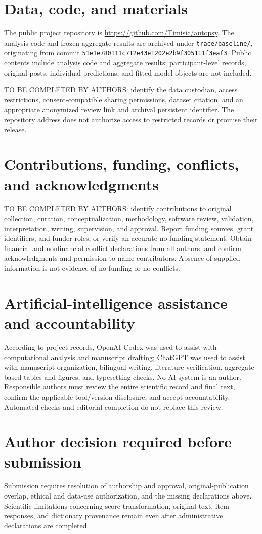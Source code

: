 \section{Data, code, and materials}
The public project repository is \url{https://github.com/Timisic/autopsy}. The analysis code and frozen aggregate results are archived under \texttt{trace/baseline/}, originating from commit \texttt{51e1e780111c712e43e1202e2b9f305111f3eaf3}. Public contents include analysis code and aggregate results; participant-level records, original posts, individual predictions, and fitted model objects are not included.

TO BE COMPLETED BY AUTHORS: identify the data custodian, access restrictions, consent-compatible sharing permissions, dataset citation, and an appropriate anonymized review link and archival persistent identifier. The repository address does not authorize access to restricted records or promise their release.

\section{Contributions, funding, conflicts, and acknowledgments}
TO BE COMPLETED BY AUTHORS: identify contributions to original collection, curation, conceptualization, methodology, software review, validation, interpretation, writing, supervision, and approval. Report funding sources, grant identifiers, and funder roles, or verify an accurate no-funding statement. Obtain financial and nonfinancial conflict declarations from all authors, and confirm acknowledgments and permission to name contributors. Absence of supplied information is not evidence of no funding or no conflicts.

\section{Artificial-intelligence assistance and accountability}
According to project records, OpenAI Codex was used to assist with computational analysis and manuscript drafting; ChatGPT was used to assist with manuscript organization, bilingual writing, literature verification, aggregate-based tables and figures, and typesetting checks. No AI system is an author. Responsible authors must review the entire scientific record and final text, confirm the applicable tool/version disclosure, and accept accountability. Automated checks and editorial completion do not replace this review.

\section{Author decision required before submission}
Submission requires resolution of authorship and approval, original-publication overlap, ethical and data-use authorization, and the missing declarations above. Scientific limitations concerning score transformation, original text, item responses, and dictionary provenance remain even after administrative declarations are completed.

